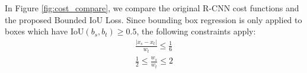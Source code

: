 \documentclass[10pt,twocolumn,letterpaper]{article}
\begin{document}
\begin{figure*}[tb]
\caption{Comparing R-CNN bounding box regression loss (purple) and proposed Bounded IoU Loss (blue). Red dotted lines indicate the typical operating range given $\mathrm{IoU} \geq 0.5$. Bounded IoU Loss places a much greater emphasis on position.} 
\label{fig:cost_compare}
\end{figure*}

In Figure \ref{fig:cost_compare}, we compare the original R-CNN cost functions and the proposed Bounded IoU Loss. Since bounding box regression is only applied to boxes which have $\mathrm{IoU}(b_s, b_t) \geq 0.5$, the following constraints apply:
\begin{gather}
\frac{|x_s - x_t|}{w_t} \leq \frac{1}{6} \\
\frac{1}{2} \leq \frac{w_s}{w_t} \leq 2
\end{gather}
\end{document}
